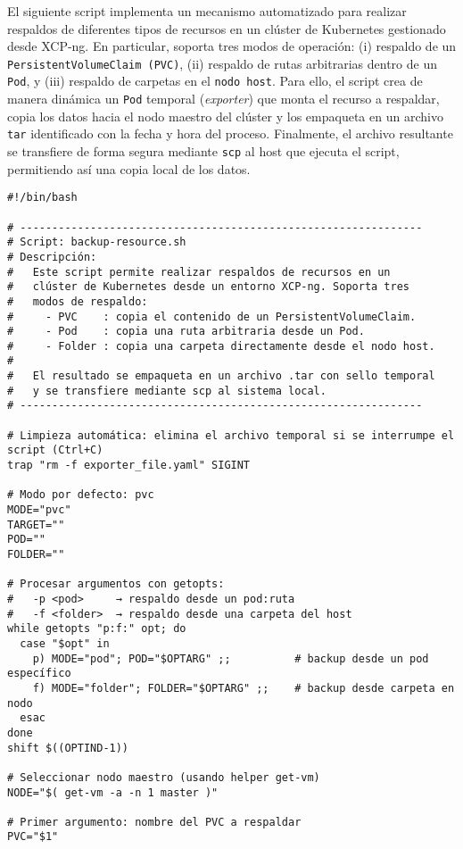 El siguiente script implementa un mecanismo automatizado para realizar respaldos de diferentes tipos de recursos en un clúster de Kubernetes gestionado desde XCP-ng. En particular, soporta tres modos de operación: (i) respaldo de un \texttt{PersistentVolumeClaim (PVC)}, (ii) respaldo de rutas arbitrarias dentro de un \texttt{Pod}, y (iii) respaldo de carpetas en el \texttt{nodo host}. Para ello, el script crea de manera dinámica un \texttt{Pod} temporal (\textit{exporter}) que monta el recurso a respaldar, copia los datos hacia el nodo maestro del clúster y los empaqueta en un archivo \texttt{tar} identificado con la fecha y hora del proceso. Finalmente, el archivo resultante se transfiere de forma segura mediante \texttt{scp} al host que ejecuta el script, permitiendo así una copia local de los datos.

\begin{verbatim}
#!/bin/bash

# ---------------------------------------------------------------
# Script: backup-resource.sh
# Descripción:
#   Este script permite realizar respaldos de recursos en un 
#   clúster de Kubernetes desde un entorno XCP-ng. Soporta tres
#   modos de respaldo:
#     - PVC    : copia el contenido de un PersistentVolumeClaim.
#     - Pod    : copia una ruta arbitraria desde un Pod.
#     - Folder : copia una carpeta directamente desde el nodo host.
#
#   El resultado se empaqueta en un archivo .tar con sello temporal
#   y se transfiere mediante scp al sistema local.
# ---------------------------------------------------------------

# Limpieza automática: elimina el archivo temporal si se interrumpe el script (Ctrl+C)
trap "rm -f exporter_file.yaml" SIGINT

# Modo por defecto: pvc
MODE="pvc"
TARGET=""
POD=""
FOLDER=""

# Procesar argumentos con getopts:
#   -p <pod>     → respaldo desde un pod:ruta
#   -f <folder>  → respaldo desde una carpeta del host
while getopts "p:f:" opt; do
  case "$opt" in
    p) MODE="pod"; POD="$OPTARG" ;;          # backup desde un pod específico
    f) MODE="folder"; FOLDER="$OPTARG" ;;    # backup desde carpeta en nodo
  esac
done
shift $((OPTIND-1))

# Seleccionar nodo maestro (usando helper get-vm)
NODE="$( get-vm -a -n 1 master )"

# Primer argumento: nombre del PVC a respaldar
PVC="$1"


\end{verbatim}
